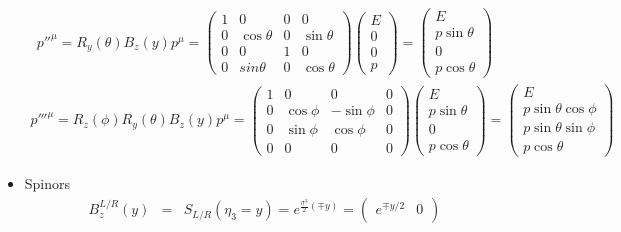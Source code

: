 \documentclass[11pt]{article}
\begin{document}
\begin{itemize}
    \begin{eqnarray}
        {p{''}}^\mu = R_y(\theta)B_z(y) p^\mu =
        \begin{pmatrix}
            1 & 0 & 0 & 0 \\
            0 &\cos\theta & 0 &\sin\theta \\
            0 & 0 & 1 & 0\\
            0 &sin\theta & 0 & \cos\theta
        \end{pmatrix}
        \begin{pmatrix}
            E \\ 0 \\ 0 \\ p
        \end{pmatrix} 
        =
        \begin{pmatrix}
          E \\ p \sin\theta \\ 0 \\ p\cos\theta
        \end{pmatrix} 
    \end{eqnarray}
    \begin{eqnarray}
        {p{'''}}^\mu = R_z(\phi)R_y(\theta)B_z(y) p^\mu =
        \begin{pmatrix}
         1 & 0 & 0 & 0\\
         0 & \cos\phi & -\sin\phi & 0 \\
         0 & \sin\phi & \cos\phi & 0 \\
         0 & 0 & 0 & 0
        \end{pmatrix}
        \begin{pmatrix}
            E \\ p \sin\theta \\ 0 \\ p\cos\theta
          \end{pmatrix} 
          =
        \begin{pmatrix}
          E \\ p\sin\theta\cos\phi \\ p\sin\theta\sin\phi \\ p\cos\theta
        \end{pmatrix}
    \end{eqnarray}
    \item Spinors
    \begin{eqnarray}
        B_z^{L/R}(y)&=&S_{L/R}(\eta_3=y)=e^{\frac{\sigma^3}{2}(\mp y)}=
        \begin{pmatrix}
            e^{\mp y/2} & 0\\

\end{pmatrix}
\end{eqnarray}
\end{itemize}
\end{document}
